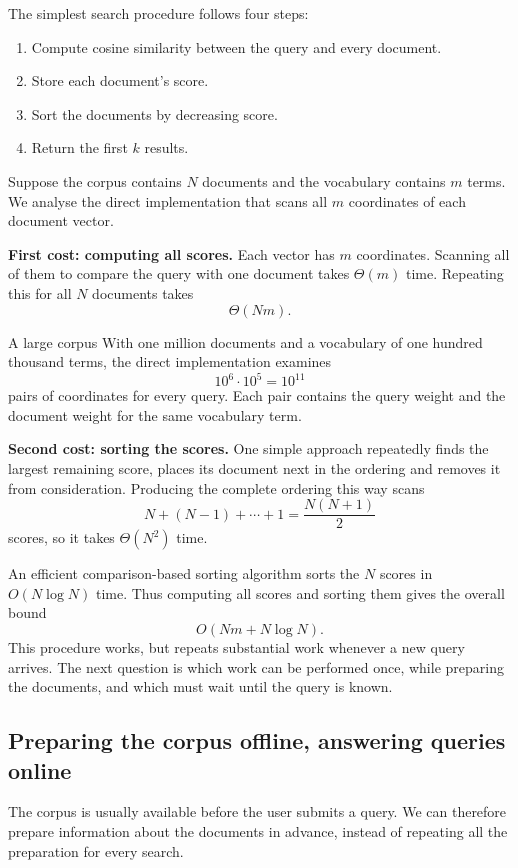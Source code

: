 \documentclass[a4paper,12pt,oneside]{report}
\begin{document}
The simplest search procedure follows four steps:
\begin{enumerate}
  \item Compute cosine similarity between the query and every document.
  \item Store each document's score.
  \item Sort the documents by decreasing score.
  \item Return the first $k$ results.
\end{enumerate}
Suppose the corpus contains $N$ documents and the vocabulary contains
$m$ terms. We analyse the direct implementation that scans all $m$
coordinates of each document vector.

\textbf{First cost: computing all scores.}
Each vector has $m$ coordinates. Scanning all of them to compare the
query with one document takes $\Theta(m)$ time. Repeating this for
all $N$ documents takes
\[
  \Theta(Nm).
\]
\begin{framedexample}{A large corpus}
With one million documents and a vocabulary of one hundred thousand
terms, the direct implementation examines
\[
  10^6\cdot10^5=10^{11}
\]
pairs of coordinates for every query. Each pair contains the query
weight and the document weight for the same vocabulary term.
\end{framedexample}

\textbf{Second cost: sorting the scores.}
One simple approach repeatedly finds the largest remaining score,
places its document next in the ordering and removes it from
consideration. Producing the complete ordering this way scans
\[
  N+(N-1)+\cdots+1=\frac{N(N+1)}2
\]
scores, so it takes $\Theta(N^2)$ time.

An efficient comparison-based sorting algorithm sorts the $N$ scores
in $O(N\log N)$ time. Thus computing all scores and sorting them gives
the overall bound
\[
  O(Nm+N\log N).
\]
This procedure works, but repeats substantial work whenever a new
query arrives. The next question is which work can be performed once,
while preparing the documents, and which must wait until the query
is known.

\subsection{Preparing the corpus offline, answering queries online}

The corpus is usually available before the user submits a query.
We can therefore prepare information about the documents in advance,
instead of repeating all the preparation for every search.
\end{document}
